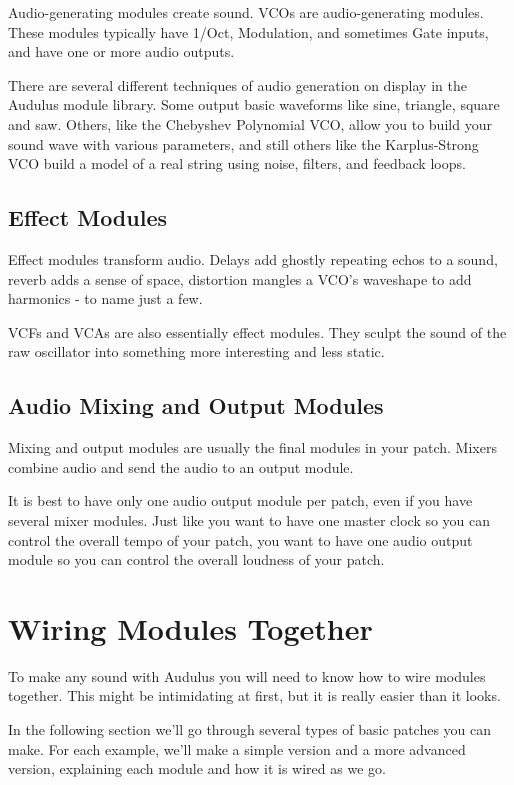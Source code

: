 \documentclass[11pt]{book}
\begin{document}
\begin{multicols*}{2}
Audio-generating modules create sound. VCOs are audio-generating modules. These modules typically have 1/Oct, Modulation, and sometimes Gate inputs, and have one or more audio outputs.

There are several different techniques of audio generation on display in the Audulus module library. Some output basic waveforms like sine, triangle, square and saw. Others, like the Chebyshev Polynomial VCO, allow you to build your sound wave with various parameters, and still others like the Karplus-Strong VCO build a model of a real string using noise, filters, and feedback loops.

\subsection{Effect Modules}

Effect modules transform audio. Delays add ghostly repeating echos to a sound, reverb adds a sense of space, distortion mangles a VCO's waveshape to add harmonics - to name just a few.

VCFs and VCAs are also essentially effect modules. They sculpt the sound of the raw oscillator into something more interesting and less static.

\subsection{Audio Mixing and Output Modules}

Mixing and output modules are usually the final modules in your patch. Mixers combine audio and send the audio to an output module.

It is best to have only one audio output module per patch, even if you have several mixer modules. Just like you want to have one master clock so you can control the overall tempo of your patch, you want to have one audio output module so you can control the overall loudness of your patch.


\section{Wiring Modules Together}

To make any sound with Audulus you will need to know how to wire modules together. This might be intimidating at first, but it is really easier than it looks.

In the following section we'll go through several types of basic patches you can make. For each example, we'll make a simple version and a more advanced version, explaining each module and how it is wired as we go.


\end{multicols*}
\end{document}
